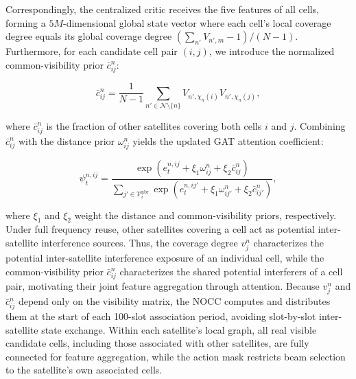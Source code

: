 \documentclass[11pt,a4paper]{article}
\begin{document}
Correspondingly, the centralized critic receives the five features of all cells, forming a $5M$-dimensional global state vector where each cell's local coverage degree equals its global coverage degree $(\sum_{n'}V_{n',m}-1)/(N-1)$. Furthermore, for each candidate cell pair $(i,j)$, we introduce the normalized common-visibility prior $\bar c_{ij}^n$:
\par

\[
\bar c_{ij}^n=\frac{1}{N-1}\sum_{n'\in\mathcal N\setminus\{n\}}V_{n',\chi_n(i)}V_{n',\chi_n(j)},
\]

where $\bar c_{ij}^n$ is the fraction of other satellites covering both cells $i$ and $j$. Combining $\bar c_{ij}^n$ with the distance prior $\omega_{ij}^n$ yields the updated GAT attention coefficient:
\par

\[
\psi_t^{n,ij}=
\frac{\exp(e_t^{n,ij}+\xi_1\omega_{ij}^n+\xi_2\bar c_{ij}^n)}
{\sum_{j'\in\mathcal V_i^{\mathrm{nbr}}}\exp(e_t^{n,ij'}+\xi_1\omega_{ij'}^n+\xi_2\bar c_{ij'}^n)},
\]

where $\xi_1$ and $\xi_2$ weight the distance and common-visibility priors, respectively. Under full frequency reuse, other satellites covering a cell act as potential inter-satellite interference sources. Thus, the coverage degree $v_j^n$ characterizes the potential inter-satellite interference exposure of an individual cell, while the common-visibility prior $\bar c_{ij}^n$ characterizes the shared potential interferers of a cell pair, motivating their joint feature aggregation through attention. Because $v_j^n$ and $\bar c_{ij}^n$ depend only on the visibility matrix, the NOCC computes and distributes them at the start of each 100-slot association period, avoiding slot-by-slot inter-satellite state exchange. Within each satellite's local graph, all real visible candidate cells, including those associated with other satellites, are fully connected for feature aggregation, while the action mask restricts beam selection to the satellite's own associated cells.
\par
\end{document}
